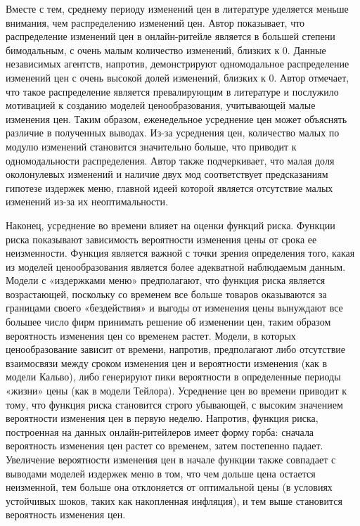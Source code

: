 Вместе с тем, среднему периоду изменений цен в литературе уделяется меньше внимания, чем распределению изменений цен. Автор показывает, что распределение изменений цен в онлайн-ритейле является в большей степени бимодальным, с очень малым количество изменений, близких к 0. Данные независимых агентств, напротив, демонстрируют одномодальное распределение изменений цен с очень высокой долей изменений, близких к 0. Автор отмечает, что такое распределение является превалирующим в литературе и послужило мотивацией к созданию моделей ценообразования, учитывающей малые изменения цен. Таким образом, еженедельное усреднение цен может объяснять различие в полученных выводах. Из-за усреднения цен, количество малых по модулю изменений становится значительно больше, что приводит к одномодальности распределения. Автор также подчеркивает, что малая доля околонулевых изменений и наличие двух мод соответствует предсказаниям гипотезе издержек меню, главной идеей которой является отсутствие малых изменений из-за их неоптимальности.

Наконец, усреднение во времени влияет на оценки функций риска. Функции риска показывают зависимость вероятности изменения цены от срока ее неизменности. Функция является важной с точки зрения определения того, какая из моделей ценообразования является более адекватной наблюдаемым данным. Модели с «издержками меню» предполагают, что функция риска является возрастающей, поскольку со временем все больше товаров оказываются за границами своего «бездействия» и выгоды от изменения цены вынуждают все большее число фирм принимать решение об изменении цен, таким образом вероятность изменения цен со временем растет. Модели, в которых ценообразование зависит от времени, напротив, предполагают либо отсутствие взаимосвязи между сроком изменения цен и вероятности изменения (как в модели Кальво), либо генерируют пики вероятности в определенные периоды «жизни» цены (как в модели Тейлора). Усреднение цен во времени приводит к тому, что функция риска становится строго убывающей, с высоким значением вероятности изменения цен в первую неделю. Напротив, функция риска, построенная на данных онлайн-ритейлеров имеет форму горба: сначала вероятность изменения цен растет со временем, затем постепенно падает. Увеличение вероятности изменения цен в начале функции также совпадает с выводами моделей издержек меню в том, что чем дольше цена остается неизменной, тем больше она отклоняется от оптимальной цены (в условиях устойчивых шоков, таких как накопленная инфляция), и тем выше становится вероятность изменения цен.

